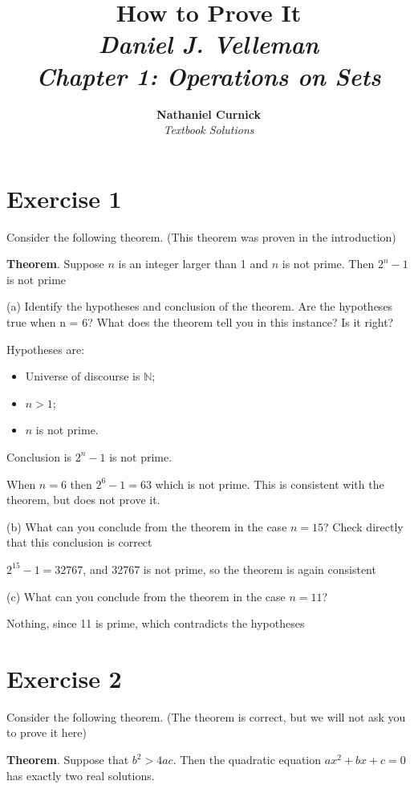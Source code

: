 \documentclass[11pt]{article}
\title{\textbf{How to Prove It} \\ {\Large\itshape Daniel J. Velleman} \\ {\Large\itshape Chapter 1: Operations on Sets}}
\author{\textbf{Nathaniel Curnick} \\ \textit{Textbook Solutions}}
\date{}
\begin{document}
\maketitle

\section*{Exercise 1}

Consider the following theorem. (This theorem was proven in the introduction)

\textbf{Theorem}. Suppose $n$ is an integer larger than 1 and $n$ is not prime.
Then $2^n - 1$ is not prime 

\noindent (a) Identify the hypotheses and conclusion of the theorem. Are the 
hypotheses true when n = 6? What does the theorem tell you in this instance? 
Is it right?

Hypotheses are:

\begin{itemize}
    \item Universe of discourse is $\mathbb{N}$;
    \item $n > 1$;
    \item $n$ is not prime.
\end{itemize}

Conclusion is $2^n - 1$ is not prime.

When $n = 6$ then $2^6 - 1 = 63$ which is not prime. This is consistent with the 
theorem, but does not prove it.

\noindent (b) What can you conclude from the theorem in the case $n = 15$? 
Check directly that this conclusion is correct

$2^15 - 1 = 32767$, and 32767 is not prime, so the theorem is again consistent

\noindent (c) What can you conclude from the theorem in the case $n=11$?

Nothing, since 11 is prime, which contradicts the hypotheses

\section*{Exercise 2}

Consider the following theorem. (The theorem is correct, but we will not ask 
you to prove it here)

\textbf{Theorem}. Suppose that $b^2 > 4ac$. Then the quadratic equation 
$ax^2 + bx + c = 0$ has exactly two real solutions.
\end{document}
